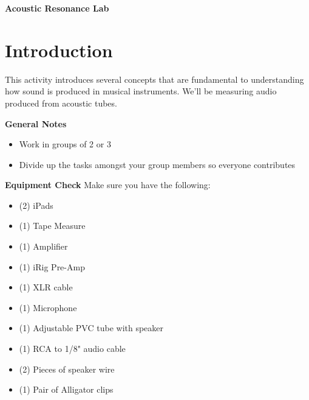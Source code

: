 \documentclass[12pt]{article}
\begin{document}
\begin{center}
{\Large \bf Acoustic Resonance Lab}\\
\end{center}

\vspace{0.2in}


\vspace{.2in}

\section{Introduction}
This activity introduces several concepts that are fundamental to understanding how sound is produced in musical instruments. We'll be measuring audio produced from acoustic tubes.

\textbf{General Notes}

\begin{itemize}
\item Work in groups of 2 or 3 
\item Divide up the tasks amongst your group members so everyone contributes
\end{itemize}

\textbf{Equipment Check} Make sure you have the following:

\begin{multicols}{2}
\begin{itemize}
\item (2) iPads
\item (1) Tape Measure
\item (1) Amplifier
\item (1) iRig Pre-Amp
\item (1) XLR cable
\item (1) Microphone
\item (1) Adjustable PVC tube with speaker
\item (1) RCA to 1/8" audio cable
\item (2) Pieces of speaker wire
\item (1) Pair of Alligator clips
\end{itemize}
\end{multicols}
% 
% 
\end{document}
